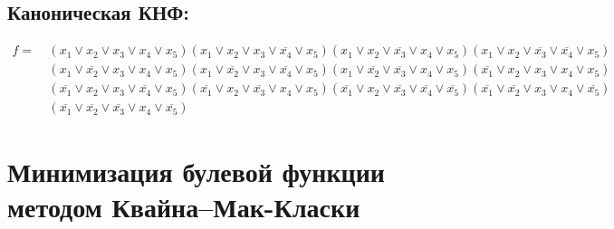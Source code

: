 \documentclass{article}
\begin{document}
\subsection*{Каноническая КНФ:}
\begin{align*}
f =\: &\left(x_{1} \lor x_{2} \lor x_{3} \lor x_{4} \lor x_{5}\right)\left(x_{1} \lor x_{2} \lor x_{3} \lor \overline{x_{4}} \lor x_{5}\right)\left(x_{1} \lor x_{2} \lor \overline{x_{3}} \lor x_{4} \lor x_{5}\right)\left(x_{1} \lor x_{2} \lor \overline{x_{3}} \lor \overline{x_{4}} \lor x_{5}\right)\\&\left(x_{1} \lor \overline{x_{2}} \lor x_{3} \lor x_{4} \lor x_{5}\right)\left(x_{1} \lor \overline{x_{2}} \lor x_{3} \lor \overline{x_{4}} \lor x_{5}\right)\left(x_{1} \lor \overline{x_{2}} \lor \overline{x_{3}} \lor x_{4} \lor x_{5}\right)\left(\overline{x_{1}} \lor x_{2} \lor x_{3} \lor x_{4} \lor x_{5}\right)\\&\left(\overline{x_{1}} \lor x_{2} \lor x_{3} \lor \overline{x_{4}} \lor x_{5}\right)\left(\overline{x_{1}} \lor x_{2} \lor \overline{x_{3}} \lor x_{4} \lor x_{5}\right)\left(\overline{x_{1}} \lor x_{2} \lor \overline{x_{3}} \lor \overline{x_{4}} \lor \overline{x_{5}}\right)\left(\overline{x_{1}} \lor \overline{x_{2}} \lor x_{3} \lor x_{4} \lor \overline{x_{5}}\right)\\&\left(\overline{x_{1}} \lor \overline{x_{2}} \lor \overline{x_{3}} \lor x_{4} \lor \overline{x_{5}}\right)\end{align*}
\section*{Минимизация булевой функции методом Квайна--Мак-Класки}
\end{document}
